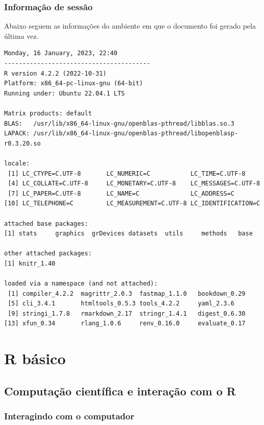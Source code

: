 \documentclass[
  10pt,
  a4paper]{book}
\begin{document}
\hypertarget{informauxe7uxe3o-de-sessuxe3o}{%
\section*{Informação de sessão}\label{informauxe7uxe3o-de-sessuxe3o}}


Abaixo seguem as informações do ambiente em que o documento foi gerado
pela última vez.

\begin{verbatim}
Monday, 16 January, 2023, 22:40
----------------------------------------
R version 4.2.2 (2022-10-31)
Platform: x86_64-pc-linux-gnu (64-bit)
Running under: Ubuntu 22.04.1 LTS

Matrix products: default
BLAS:   /usr/lib/x86_64-linux-gnu/openblas-pthread/libblas.so.3
LAPACK: /usr/lib/x86_64-linux-gnu/openblas-pthread/libopenblasp-r0.3.20.so

locale:
 [1] LC_CTYPE=C.UTF-8       LC_NUMERIC=C           LC_TIME=C.UTF-8       
 [4] LC_COLLATE=C.UTF-8     LC_MONETARY=C.UTF-8    LC_MESSAGES=C.UTF-8   
 [7] LC_PAPER=C.UTF-8       LC_NAME=C              LC_ADDRESS=C          
[10] LC_TELEPHONE=C         LC_MEASUREMENT=C.UTF-8 LC_IDENTIFICATION=C   

attached base packages:
[1] stats     graphics  grDevices datasets  utils     methods   base     

other attached packages:
[1] knitr_1.40

loaded via a namespace (and not attached):
 [1] compiler_4.2.2  magrittr_2.0.3  fastmap_1.1.0   bookdown_0.29  
 [5] cli_3.4.1       htmltools_0.5.3 tools_4.2.2     yaml_2.3.6     
 [9] stringi_1.7.8   rmarkdown_2.17  stringr_1.4.1   digest_0.6.30  
[13] xfun_0.34       rlang_1.0.6     renv_0.16.0     evaluate_0.17  
\end{verbatim}

\hypertarget{part-r-buxe1sico}{%
\part{R básico}\label{part-r-buxe1sico}}

\hypertarget{computauxe7uxe3o-cientuxedfica-e-interauxe7uxe3o-com-o-r}{%
\chapter{Computação científica e interação com o R}\label{computauxe7uxe3o-cientuxedfica-e-interauxe7uxe3o-com-o-r}}

\hypertarget{interagindo-com-o-computador}{%
\section{Interagindo com o computador}\label{interagindo-com-o-computador}}
\end{document}
